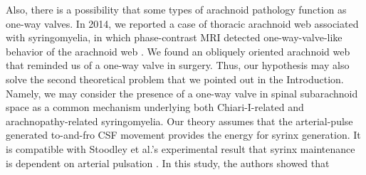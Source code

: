 \documentclass[fleqn,10pt]{wlscirep}
\begin{document}
Also, there is a possibility that some types of arachnoid pathology
function as one-way valves. In 2014, we reported a case of thoracic
arachnoid web associated with syringomyelia, in which phase-contrast MRI
detected one-way-valve-like behavior of the arachnoid web
\cite{chang2014dorsal}. We found an obliquely oriented arachnoid web that
reminded us of a one-way valve in surgery. Thus, our hypothesis may also
solve the second theoretical problem that we pointed out in the
Introduction. Namely, we may consider the presence of a one-way valve in
spinal subarachnoid space as a common mechanism underlying both
Chiari-I-related and arachnopathy-related syringomyelia.  Our theory
assumes that the arterial-pulse generated to-and-fro CSF movement provides
the energy for syrinx generation. It is compatible with Stoodley et al.'s
experimental result that syrinx maintenance is dependent on arterial
pulsation \cite{stoodley2000mechanisms}. In this study, the authors showed that


\end{document}
